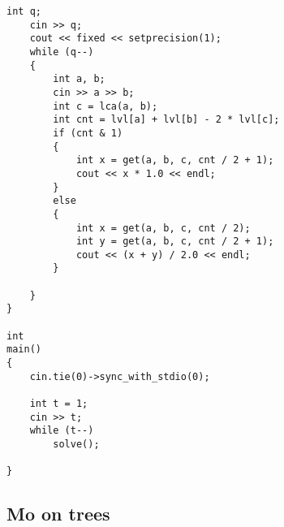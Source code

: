 \begin{lstlisting}[style=cpp]
	int q;
	cin >> q;
	cout << fixed << setprecision(1);
	while (q--)
	{
		int a, b;
		cin >> a >> b;
		int c = lca(a, b);
		int cnt = lvl[a] + lvl[b] - 2 * lvl[c];
		if (cnt & 1)
		{
			int x = get(a, b, c, cnt / 2 + 1);
			cout << x * 1.0 << endl;
		}
		else
		{
			int x = get(a, b, c, cnt / 2);
			int y = get(a, b, c, cnt / 2 + 1);
			cout << (x + y) / 2.0 << endl;
		}

	}
}

int
main()
{
	cin.tie(0)->sync_with_stdio(0);

	int t = 1;
	cin >> t;
	while (t--)
		solve();

}
\end{lstlisting}

\subsection{Mo on trees}

